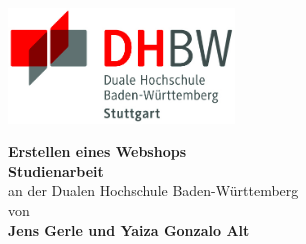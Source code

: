 \begin{titlepage}
	\thispagestyle{fancynopage}
	\centering
	\includegraphics[width=0.45\textwidth]{bilder/dhbw_logo.jpg}
	\enlargethispage{20mm}
	\begin{center}
		\vspace*{12mm}	{\LARGE\textbf{Erstellen eines Webshops}}\\
		\vspace*{12mm}
		\vspace*{12mm}	{\large\textbf{Studienarbeit}}\\
		\vspace*{12mm}
		\vspace*{3mm}	an der Dualen Hochschule Baden-Württemberg\\
		\vspace*{12mm}	von\\
		\vspace*{3mm}	{\large\textbf{Jens Gerle und Yaiza Gonzalo Alt}}\\
	\end{center}
	\vfill
	
\end{titlepage}